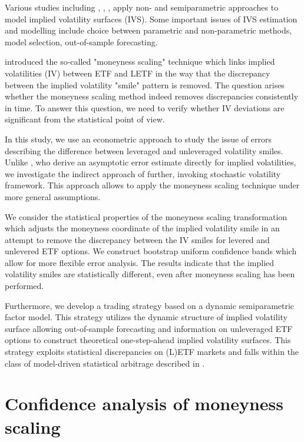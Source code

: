 \documentclass{rQUF2e}
\theoremstyle{plain}
\theoremstyle{definition}
\begin{document}
	Various studies including \citet{ait_sahalia_et_al}, \citet{cont_da_fonseca}, \citet{fengler_haerdle_villa}, \citet{fengler_haerdle_mammen}  apply non- and semiparametric approaches to model implied volatility surfaces (IVS). Some important issues of IVS estimation and modelling include choice between parametric and non-parametric methods, model selection, out-of-sample forecasting.
	
	\citet{leung_sircar} introduced the so-called "moneyness scaling" technique which links implied volatilities (IV) between ETF and LETF in the way that the discrepancy between the implied volatility "smile" pattern is removed. The question arises whether the moneyness scaling method indeed removes discrepancies consistently in time. To answer this question, we need to verify whether IV deviations are significant from the statistical point of view. 
	
	In this study, we use an econometric approach to study the issue of errors describing the difference between leveraged and unleveraged volatility smiles. Unlike \citet{lee_wang}, who derive an asymptotic error estimate directly for implied volatilities, we investigate the indirect approach of \citet{leung_sircar} further, invoking stochastic volatility framework. This approach allows to apply the moneyness scaling technique under more general assumptions. 
	
	We consider the statistical properties of the moneyness scaling transformation which adjusts the moneyness coordinate of the implied volatility smile in an attempt to remove the discrepancy between the IV smiles for levered and unlevered ETF options. We construct bootstrap uniform confidence bands which allow for more flexible error analysis. The results indicate that the implied volatility smiles are statistically different, even after moneyness scaling has been performed.
	
	Furthermore, we develop a trading strategy based on a dynamic semiparametric factor model. This strategy utilizes the dynamic structure of implied volatility surface allowing out-of-sample forecasting and information on unleveraged ETF options to construct theoretical one-step-ahead implied volatility surfaces. This strategy exploits statistical discrepancies on (L)ETF markets and falls within the class of model-driven statistical arbitrage described in \citet{avellaneda_lee}.
	
	
	
	\section{Confidence analysis of moneyness scaling}
	
\end{document}
